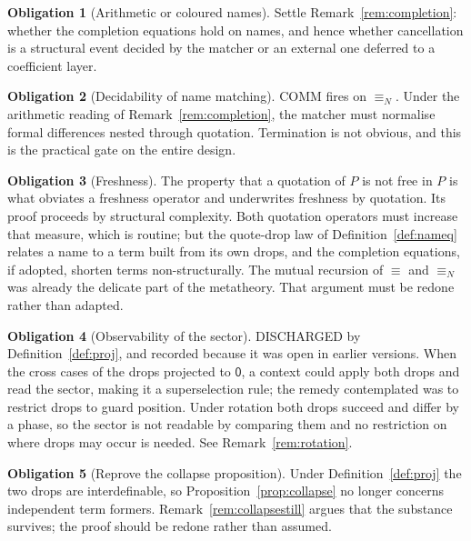 \documentclass[11pt]{article}
\theoremstyle{definition}
\newtheorem{obligation}{Obligation}
\theoremstyle{remark}
\newcommand{\pzero}{\mathsf{0}}
\newcommand{\scong}{\ensuremath{\equiv}}
\newcommand{\nameq}{\ensuremath{\equiv_{N}}}
\begin{document}
\begin{obligation}[Arithmetic or coloured names]
Settle Remark~\ref{rem:completion}: whether the completion equations hold on
names, and hence whether cancellation is a structural event decided by the
matcher or an external one deferred to a coefficient layer.
\end{obligation}

\begin{obligation}[Decidability of name matching]
\label{ob:decidability}
COMM fires on $\nameq$. Under the arithmetic reading of
Remark~\ref{rem:completion}, the matcher must normalise formal differences
nested through quotation. Termination is not obvious, and this is the practical
gate on the entire design.
\end{obligation}

\begin{obligation}[Freshness]
\label{ob:freshness}
The property that a quotation of $P$ is not free in $P$ is what obviates a
freshness operator and underwrites freshness by quotation. Its proof proceeds by
structural complexity. Both quotation operators must increase that measure,
which is routine; but the quote-drop law of Definition~\ref{def:nameq} relates a
name to a term built from its own drops, and the completion equations, if
adopted, shorten terms non-structurally. The mutual recursion of $\scong$ and
$\nameq$ was already the delicate part of the metatheory. That argument must be
redone rather than adapted.
\end{obligation}

\begin{obligation}[Observability of the sector]
\label{ob:observability}
DISCHARGED by Definition~\ref{def:proj}, and recorded because it was open in
earlier versions. When the cross cases of the drops projected to $\pzero$, a
context could apply both drops and read the sector, making it a superselection
rule; the remedy contemplated was to restrict drops to guard position. Under
rotation both drops succeed and differ by a phase, so the sector is not readable
by comparing them and no restriction on where drops may occur is needed. See
Remark~\ref{rem:rotation}.
\end{obligation}

\begin{obligation}[Reprove the collapse proposition]
\label{ob:collapse}
Under Definition~\ref{def:proj} the two drops are interdefinable, so
Proposition~\ref{prop:collapse} no longer concerns independent term formers.
Remark~\ref{rem:collapsestill} argues that the substance survives; the proof
should be redone rather than assumed.
\end{obligation}
\end{document}
